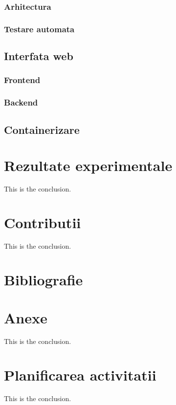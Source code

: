 \documentclass[titlepage,12pt]{article}
\begin{document}
\subsubsection{Arhitectura}
\subsubsection{Testare automata}
\subsection{Interfata web}
\subsubsection{Frontend}
\subsubsection{Backend}
\subsection{Containerizare}

\section{Rezultate experimentale}
This is the conclusion.

\section{Contributii}
This is the conclusion.

\section{Bibliografie}
\printbibliography
\clearpage

\section{Anexe}
This is the conclusion.

\section{Planificarea activitatii}
This is the conclusion.
\end{document}
